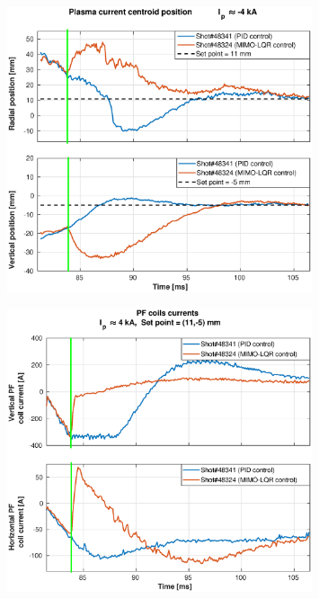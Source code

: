 \begin{figure}
	\centering
	\includegraphics[width=0.8\textwidth]{Chp5/PIDvsMIMO_341_324_2.eps}
	\label{341_342}
\end{figure}

\begin{figure}
	\centering
	\includegraphics[width=0.8\textwidth]{Chp5/PIDvsMIMO_341_324_curr_2.eps}
	\label{341_342_curr}
\end{figure}


